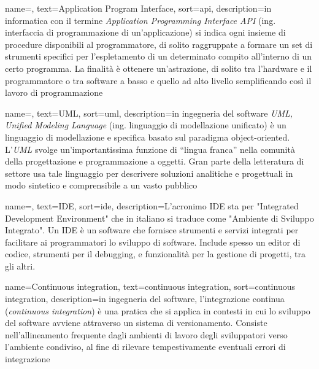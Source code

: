 

 {
    name=,
    text=Application Program Interface,
    sort=api,
    description={in informatica con il termine \emph{Application Programming Interface API} (ing. interfaccia di programmazione di un'applicazione) si indica ogni insieme di procedure disponibili al programmatore, di solito raggruppate a formare un set di strumenti specifici per l'espletamento di un determinato compito all'interno di un certo programma. La finalità è ottenere un'astrazione, di solito tra l'hardware e il programmatore o tra software a basso e quello ad alto livello semplificando così il lavoro di programmazione}
}

 {
    name=,
    text=UML,
    sort=uml,
    description={in ingegneria del software \emph{UML, Unified Modeling Language} (ing. linguaggio di modellazione unificato) è un linguaggio di modellazione e specifica basato sul paradigma object-oriented. L'\emph{UML} svolge un'importantissima funzione di ``lingua franca'' nella comunità della progettazione e programmazione a oggetti. Gran parte della letteratura di settore usa tale linguaggio per descrivere soluzioni analitiche e progettuali in modo sintetico e comprensibile a un vasto pubblico}
}

 {
    name=,
    text=IDE,
    sort=ide,
    description={L'acronimo IDE sta per "Integrated Development Environment" che in italiano si traduce come "Ambiente di Sviluppo Integrato". Un IDE è un software che fornisce strumenti e servizi integrati per facilitare ai programmatori lo sviluppo di software. Include spesso un editor di codice, strumenti per il debugging, e funzionalità per la gestione di progetti, tra gli altri.}
}

 {
    name=Continuous integration,
    text=continuous integration,
    sort=continuous integration,
    description={in ingegneria del software, l'integrazione continua (\textit{continuous integration}) è una pratica che si applica in contesti in cui lo sviluppo del software avviene attraverso un sistema di versionamento. Consiste nell'allineamento frequente dagli ambienti di lavoro degli sviluppatori verso l'ambiente condiviso, al fine di rilevare tempestivamente eventuali errori di integrazione}
}

